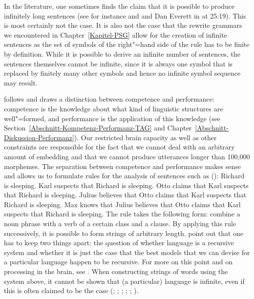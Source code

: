 In the literature, one sometimes finds the claim that it is possible to produce infinitely long
sentences (see for instance  and  and Dan Everett in  at 25:19).
This is most certainly not the case. It is also not the case that the rewrite grammars we encountered in
Chapter~\ref{Kapitel-PSG} allow for the creation of infinite sentences as the set of symbols
of the right"=hand side of the rule has to be finite by definition. While it is possible to derive
an infinite number of sentences, the sentences themselves cannot be infinite, since it is always one
symbol that is replaced by finitely many other symbols and hence no infinite symbol sequence may result.

\citet[Section~I.1]{Chomsky65a} follows \citet{Saussure16a}\nocite{Saussure16a-Fr} and draws a distinction between competence and performance:
competence is the knowledge about what kind of linguistic structures are well"=formed, and performance is the application of this knowledge (see
Section~\ref{Abschnitt-Kompetenz-Performanz-TAG} and Chapter~\ref{Abschnitt-Diskussion-Performanz}).
Our restricted brain capacity as well as other constraints are responsible for the fact that we cannot deal with an arbitrary amount of embedding
and that we cannot produce utterances longer than 100,000 morphemes. The separation between competence and performance makes sense and allows us to
formulate rules for the analysis of sentences such as ():
\eal 
\label{Beispiel-Satzeinbettung}
\ex Richard is sleeping.
\ex Karl suspects that Richard is sleeping.
\ex Otto claims that Karl suspects that Richard is sleeping.
\ex Julius believes that Otto claims that Karl suspects that Richard is sleeping.
\ex Max knows that Julius believes that Otto claims that Karl suspects that Richard is sleeping.
\zl
The rule takes the following form: combine a noun phrase with a verb of a certain class and a clause.
By applying this rule successively, it is possible to form strings of arbitrary length.
\citet{PS2010a} point out that one has to keep two things apart: the question of whether language
is a recursive system and whether it is just the case that the best models that we can devise for a particular
language happen to be recursive. For more on this point and on processing in the brain, see .
When constructing strings of words using the system above, it cannot be shown that (a particular) language is
infinite, even if this is often claimed to be the case (\citealp[--106]{Bierwisch66a}; \citealp[]{Pinker94a}; \citealp*[]{HCF2002a}; \citealp[]{MuellerLehrbuch1};
\citealp*[]{HNG2005a}; \citealp[]{KS2008a-u}).

